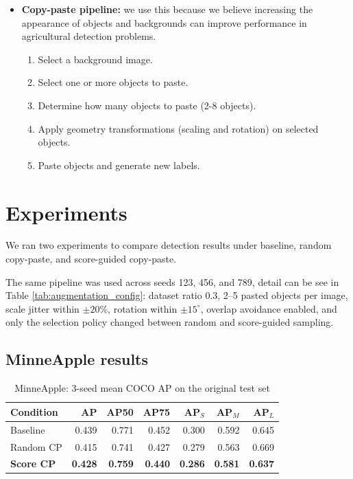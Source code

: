 \documentclass[11pt, a4paper]{article}
\begin{document}
\begin{itemize}
With aggregation weights $w_1,w_2\ge0$, we define:
\[
S_{\mathrm{img}}(I)=w_1\cdot\frac{1}{|G(I)|}\sum_{g\in G(I)}S_{\mathrm{obj}}(g)\;+
\;w_2\cdot\mathrm{FP\ rate}(I;\gamma,\tau).
\]

Interpretation: higher $S_{\mathrm{img}}(I)$ indicates that the image contains harder-to-detect objects and/or a larger proportion of false positives.

\item \textbf{Copy-paste pipeline:} we use this because we believe increasing the appearance of objects and backgrounds can improve performance in agricultural detection problems.
\begin{enumerate}
\item Select a background image.
\item Select one or more objects to paste.
\item Determine how many objects to paste (2-8 objects).
\item Apply geometry transformations (scaling and rotation) on selected objects.
\item Paste objects and generate new labels.
\end{enumerate}
\end{itemize}

\section{Experiments}
We ran two experiments to compare detection results under baseline, random copy-paste, and score-guided copy-paste.

The same pipeline was used across seeds 123, 456, and 789, detail can be see in Table \ref{tab:augmentation_config}: dataset ratio 0.3, 2--5 pasted objects per image, scale jitter within $\pm 20\%$, rotation within $\pm 15^\circ$, overlap avoidance enabled, and only the selection policy changed between random and score-guided sampling.

\subsection{MinneApple results}
\begin{table}[htbp]
\centering
\small
\setlength{\tabcolsep}{4pt}
\caption{MinneApple: 3-seed mean COCO AP on the original test set}
\label{tab:minneapple_results}
\begin{tabular}{lrrrrrr}
\toprule
Condition & AP & AP50 & AP75 & AP$_S$ & AP$_M$ & AP$_L$ \\
\midrule
Baseline & 0.439 & 0.771 & 0.452 & 0.300 & 0.592 & 0.645 \\
Random CP & 0.415 & 0.741 & 0.427 & 0.279 & 0.563 & 0.669 \\
\textbf{Score CP} & \textbf{0.428} & \textbf{0.759} & \textbf{0.440} & \textbf{0.286} & \textbf{0.581} & \textbf{0.637} \\
\bottomrule
\end{tabular}%
\end{table}
\end{document}
